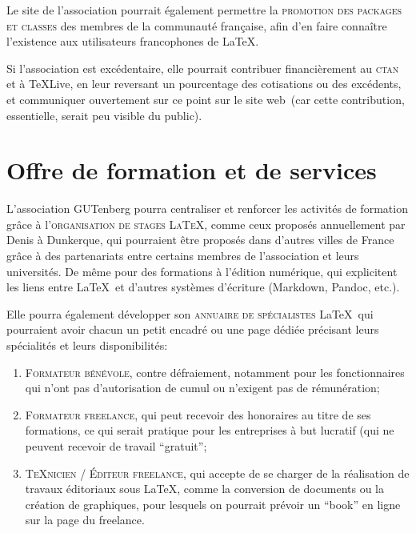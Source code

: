 \documentclass{tufte-handout}
\newcommand{\ratio}[3][]{\marginpar{\footnotesize{\textcolor{teal}{Temps requis: #2 / Utilité: #3}\par\noindent \textcolor{teal}{#1}}}}
\begin{document}
Le site de l'association\ratio[Simple mise à jour du site]{+}{+++} pourrait également permettre la \textsc{promotion des packages et classes} des membres de la communauté française, afin d'en faire connaître l'existence aux utilisateurs francophones de \LaTeX.

Si l'association est excédentaire\ratio[C'est encore un futur éloigné]{+}{+++}, elle pourrait contribuer financièrement au \textsc{ctan} et à \TeX Live, en leur reversant un pourcentage des cotisations ou des excédents, et communiquer ouvertement sur ce point sur le site web~(car cette contribution, essentielle, serait peu visible du public).


\section{Offre de formation et de services}

L'association GUTenberg\ratio[Chronophage, mais utile et potentiellement rémunéré]{+++}{+++} pourra centraliser et renforcer les activités de formation grâce à l'\textsc{organisation de stages \LaTeX}, comme ceux proposés annuellement par Denis  à Dunkerque, qui pourraient être proposés dans d'autres villes de France grâce à des partenariats entre certains membres de l'association et leurs universités. De même pour des formations à l'édition numérique, qui explicitent les liens entre \LaTeX\ et d'autres systèmes d'écriture (Markdown, Pandoc, etc.).

Elle pourra également\ratio[Gestion par les intéressés, autorisés par les administrateurs du site web]{+}{++} développer son \textsc{annuaire de spécialistes} \LaTeX\ qui pourraient avoir chacun un petit encadré ou une page dédiée précisant leurs spécialités et leurs disponibilités:
\begin{enumerate}
	\item\textsc{Formateur bénévole}, contre défraiement, notamment pour les fonctionnaires qui n'ont pas d'autorisation de cumul ou n'exigent pas de rémunération;
	\item\textsc{Formateur freelance}, qui peut recevoir des honoraires au titre de ses formations, ce qui serait pratique pour les entreprises à but lucratif (qui ne peuvent recevoir de travail \enquote{gratuit};
	\item\textsc{\TeX nicien / Éditeur freelance}, qui accepte de se charger de la réalisation de travaux éditoriaux sous \LaTeX, comme la conversion de documents ou la création de graphiques, pour lesquels on pourrait prévoir un \enquote{book} en ligne sur la page du freelance.
\end{enumerate}
\end{document}
